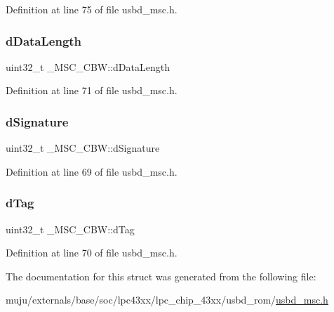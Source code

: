 Definition at line 75 of file usbd\+\_\+msc.\+h.

\mbox{\label{struct___m_s_c___c_b_w_af35538f5f1b08d48b3f11f5cb3c858ca}} 
\subsubsection{\texorpdfstring{d\+Data\+Length}{dDataLength}}
{\footnotesize\ttfamily uint32\+\_\+t \+\_\+\+M\+S\+C\+\_\+\+C\+B\+W\+::d\+Data\+Length}



Definition at line 71 of file usbd\+\_\+msc.\+h.

\mbox{\label{struct___m_s_c___c_b_w_a1fa625c9bfe68afb30fe973585627c38}} 
\subsubsection{\texorpdfstring{d\+Signature}{dSignature}}
{\footnotesize\ttfamily uint32\+\_\+t \+\_\+\+M\+S\+C\+\_\+\+C\+B\+W\+::d\+Signature}



Definition at line 69 of file usbd\+\_\+msc.\+h.

\mbox{\label{struct___m_s_c___c_b_w_a2bc3d8d87456e730b569f155a013fbda}} 
\subsubsection{\texorpdfstring{d\+Tag}{dTag}}
{\footnotesize\ttfamily uint32\+\_\+t \+\_\+\+M\+S\+C\+\_\+\+C\+B\+W\+::d\+Tag}



Definition at line 70 of file usbd\+\_\+msc.\+h.



The documentation for this struct was generated from the following file\+:\begin{DoxyCompactItemize}
\item 
muju/externals/base/soc/lpc43xx/lpc\+\_\+chip\+\_\+43xx/usbd\+\_\+rom/\hyperlink{usbd__msc_8h}{usbd\+\_\+msc.\+h}\end{DoxyCompactItemize}
